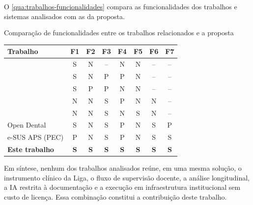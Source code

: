 O \autoref{qua:trabalhos-funcionalidades} compara as funcionalidades dos trabalhos e sistemas analisados com as da proposta.

\begin{quadro}[htbp]
	\caption{Comparação de funcionalidades entre os trabalhos relacionados e a proposta}
	\label{qua:trabalhos-funcionalidades}
	\footnotesize
	\begin{tabularx}{\textwidth}{|Y|c|c|c|c|c|c|c|}
		\hline
		\textbf{Trabalho} & \textbf{F1} & \textbf{F2} & \textbf{F3} & \textbf{F4} & \textbf{F5} & \textbf{F6} & \textbf{F7} \\ \hline
		 & S & N & -- & N & N & -- & -- \\ \hline
		 & S & N & P & P & N & -- & -- \\ \hline
		 & S & P & P & N & N & -- & -- \\ \hline
		 & N & N & S & P & N & N & -- \\ \hline
		 & N & N & S & N & S & N & -- \\ \hline
		Open Dental & S & N & S & P & N & S & P \\ \hline
		e-SUS APS (PEC) & P & N & S & P & N & S & S \\ \hline
		\textbf{Este trabalho} & \textbf{S} & \textbf{S} & \textbf{S} & \textbf{S} & \textbf{S} & \textbf{S} & \textbf{S} \\ \hline
	\end{tabularx}
\end{quadro}

Em síntese, nenhum dos trabalhos analisados reúne, em uma mesma solução, o instrumento clínico da Liga, o fluxo de supervisão docente, a análise longitudinal, a IA restrita à documentação e a execução em infraestrutura institucional sem custo de licença. Essa combinação constitui a contribuição deste trabalho.
